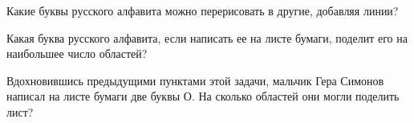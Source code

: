 ﻿
\begin{itemize}

\itA Какие буквы русского алфавита можно перерисовать в другие, добавляя линии?

\itB Какая буква русского алфавита, если написать ее на листе бумаги, поделит его на наибольшее число областей?

\itC Вдохновившись предыдущими пунктами этой задачи, мальчик Гера Симонов написал на листе бумаги две буквы О. На сколько областей они могли поделить лист?
\end{itemize}